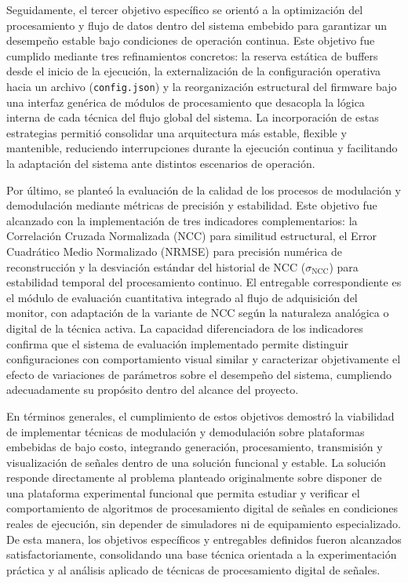 Seguidamente, el tercer objetivo específico se orientó a la optimización del procesamiento y flujo de datos dentro del sistema embebido para garantizar un desempeño estable bajo condiciones de operación continua. Este objetivo fue cumplido mediante tres refinamientos concretos: la reserva estática de buffers desde el inicio de la ejecución, la externalización de la configuración operativa hacia un archivo (\texttt{config.json}) y la reorganización estructural del firmware bajo una interfaz genérica de módulos de procesamiento que desacopla la lógica interna de cada técnica del flujo global del sistema. La incorporación de estas estrategias permitió consolidar una arquitectura más estable, flexible y mantenible, reduciendo interrupciones durante la ejecución continua y facilitando la adaptación del sistema ante distintos escenarios de operación.

Por último, se planteó la evaluación de la calidad de los procesos de modulación y demodulación mediante métricas de precisión y estabilidad. Este objetivo fue alcanzado con la implementación de tres indicadores complementarios: la Correlación Cruzada Normalizada (NCC) para similitud estructural, el Error Cuadrático Medio Normalizado (NRMSE) para precisión numérica de reconstrucción y la desviación estándar del historial de NCC ($\sigma_{\text{NCC}}$) para estabilidad temporal del procesamiento continuo. El entregable correspondiente es el módulo de evaluación cuantitativa integrado al flujo de adquisición del monitor, con adaptación de la variante de NCC según la naturaleza analógica o digital de la técnica activa. La capacidad diferenciadora de los indicadores confirma que el sistema de evaluación implementado permite distinguir configuraciones con comportamiento visual similar y caracterizar objetivamente el efecto de variaciones de parámetros sobre el desempeño del sistema, cumpliendo adecuadamente su propósito dentro del alcance del proyecto.

En términos generales, el cumplimiento de estos objetivos demostró la viabilidad de implementar técnicas de modulación y demodulación sobre plataformas embebidas de bajo costo, integrando generación, procesamiento, transmisión y visualización de señales dentro de una solución funcional y estable. La solución responde directamente al problema planteado originalmente sobre disponer de una plataforma experimental funcional que permita estudiar y verificar el comportamiento de algoritmos de procesamiento digital de señales en condiciones reales de ejecución, sin depender de simuladores ni de equipamiento especializado. De esta manera, los objetivos específicos y entregables definidos fueron alcanzados satisfactoriamente, consolidando una base técnica orientada a la experimentación práctica y al análisis aplicado de técnicas de procesamiento digital de señales.

